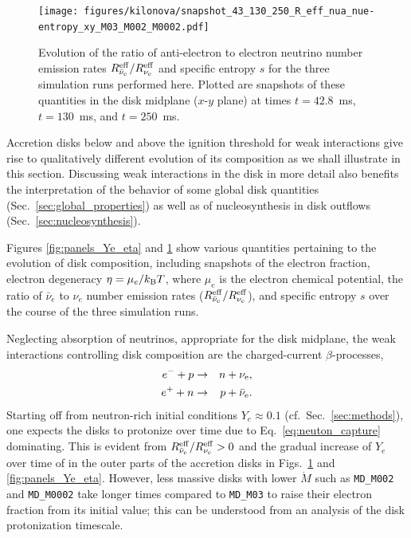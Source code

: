 \begin{figure}[t]
\centering
  \texttt{[image: figures/kilonova/snapshot\_43\_130\_250\_R\_eff\_nua\_nue-entropy\_xy\_M03\_M002\_M0002.pdf]}
 \caption{Evolution of the ratio of anti-electron to electron neutrino number emission rates $R_{\bar \nu_{\rm e}}^{\rm eff}/R_{\nu_{\rm e}}^{\rm eff}$ and specific entropy $s$ for the three simulation runs performed here. Plotted are snapshots of these quantities in the disk midplane ($x$-$y$ plane) at times $t = 42.8$~ms, $t = 130$~ms, and $t = 250$~ms.\label{fig:panels_R_eff_entropy}}
\vspace{5mm}
\end{figure}

Accretion disks below and above the ignition threshold for weak interactions give rise to qualitatively different evolution of its composition as we shall illustrate in this section. Discussing weak interactions in the disk in more detail also benefits the interpretation of the behavior of some global disk quantities (Sec.~\ref{sec:global_properties}) as well as of nucleosynthesis in disk outflows (Sec.~\ref{sec:nucleosynthesis}).

Figures \ref{fig:panels_Ye_eta} and \ref{fig:panels_R_eff_entropy} show various quantities pertaining to the evolution of disk composition, including snapshots of the electron fraction, electron degeneracy $\eta=\mu_e/k_{\rm B}T$, where $\mu_e$ is the electron chemical potential, the ratio of $\bar{\nu}_e$ to $\nu_e$ number emission rates ($R_{\bar \nu_{\rm e}}^{\rm eff}/R_{\nu_{\rm e}}^{\rm eff}$), and specific entropy $s$ over the course of the three simulation runs.

Neglecting absorption of neutrinos, appropriate for the disk midplane, the weak interactions controlling disk composition are the charged-current $\beta$-processes,
\begin{eqnarray}\label{eq:proton_capture}
      e^- + p &\rightarrow& n + \nu_{\rm e}, \label{eq:proton_capture} \\
      e^+ + n &\rightarrow& p + \bar \nu_{\rm e}. \label{eq:neuton_capture}
\end{eqnarray}
Starting off from neutron-rich initial conditions $Y_e\approx 0.1$ (cf.~Sec.~\ref{sec:methods}), one expects the disks to protonize over time due to Eq.~\eqref{eq:neuton_capture} dominating. This is evident from $R_{\bar \nu_{\rm e}}^{\rm eff}/R_{\nu_{\rm e}}^{\rm eff}>0$ and the gradual increase of $Y_e$ over time of in the outer parts of the accretion disks in Figs.~\ref{fig:panels_R_eff_entropy} and \ref{fig:panels_Ye_eta}. However, less massive disks with lower $\dot{M}$ such as \texttt{MD\_M002} and \texttt{MD\_M0002} take longer times compared to \texttt{MD\_M03} to raise their electron fraction from its initial value; this can be understood from an analysis of the disk protonization timescale.

